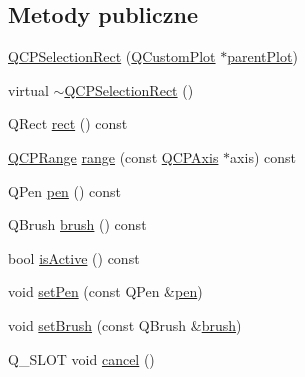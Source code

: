 \subsection*{Metody publiczne}
\begin{DoxyCompactItemize}
\item 
\hyperlink{class_q_c_p_selection_rect_ade6ee59fabcc585a1e281eb527b01867}{Q\+C\+P\+Selection\+Rect} (\hyperlink{class_q_custom_plot}{Q\+Custom\+Plot} $\ast$\hyperlink{class_q_c_p_layerable_ab7e0e94461566093d36ffc0f5312b109}{parent\+Plot})
\item 
virtual \hyperlink{class_q_c_p_selection_rect_aded186aabcdc3ee51775b7c5063e199a}{$\sim$\+Q\+C\+P\+Selection\+Rect} ()
\item 
Q\+Rect \hyperlink{class_q_c_p_selection_rect_a426d8186b04c264eb97c0713431f42fa}{rect} () const 
\item 
\hyperlink{class_q_c_p_range}{Q\+C\+P\+Range} \hyperlink{class_q_c_p_selection_rect_abef79a750c3469e88554fe134d0510fd}{range} (const \hyperlink{class_q_c_p_axis}{Q\+C\+P\+Axis} $\ast$axis) const 
\item 
Q\+Pen \hyperlink{class_q_c_p_selection_rect_a96fe01abf40bc71863ce582d843eb07c}{pen} () const 
\item 
Q\+Brush \hyperlink{class_q_c_p_selection_rect_a3759fd762c5913fc8a0fd6aa6ff4e7ff}{brush} () const 
\item 
bool \hyperlink{class_q_c_p_selection_rect_a5eb64ab5638c04a952e230de3766470e}{is\+Active} () const 
\item 
void \hyperlink{class_q_c_p_selection_rect_ada20b7fb1b2dcbe50523262636b06963}{set\+Pen} (const Q\+Pen \&\hyperlink{class_q_c_p_selection_rect_a96fe01abf40bc71863ce582d843eb07c}{pen})
\item 
void \hyperlink{class_q_c_p_selection_rect_ab0c66f1484418782efa01f4153611080}{set\+Brush} (const Q\+Brush \&\hyperlink{class_q_c_p_selection_rect_a3759fd762c5913fc8a0fd6aa6ff4e7ff}{brush})
\item 
Q\+\_\+\+S\+L\+OT void \hyperlink{class_q_c_p_selection_rect_af67bc58f4f5ce9a4dc420b9c42de235a}{cancel} ()
\end{DoxyCompactItemize}
